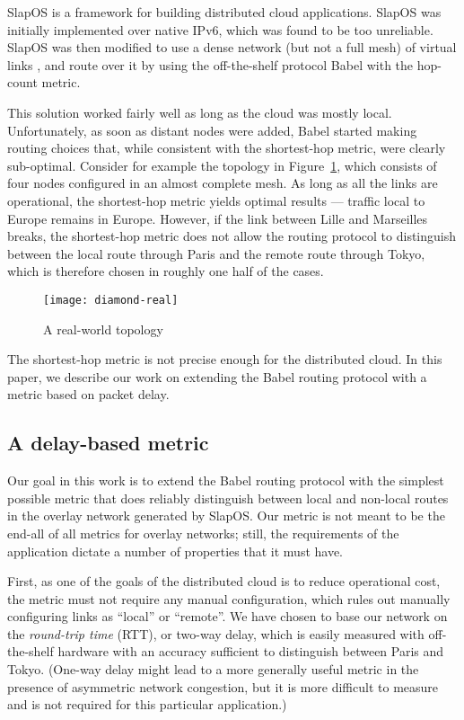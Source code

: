 \documentclass[conference,letterpaper]{IEEEtran}
\begin{document}
SlapOS is a framework for building distributed cloud applications.
SlapOS was initially implemented over native IPv6, which was found to
be too unreliable.  SlapOS was then modified to use a dense network
(but not a full mesh) of virtual links \cite{re6st}, and route over it
by using the off-the-shelf protocol Babel \cite{babel} with the
hop-count metric.

This solution worked fairly well as long as the cloud was mostly
local.  Unfortunately, as soon as distant nodes were added, Babel
started making routing choices that, while consistent with the
shortest-hop metric, were clearly sub-optimal.  Consider for example
the topology in Figure~\ref{fig:diamond-real}, which consists of four
nodes configured in an almost complete mesh.  As long as all the links
are operational, the shortest-hop metric yields optimal results ---
traffic local to Europe remains in Europe.  However, if the link
between Lille and Marseilles breaks, the shortest-hop metric does not
allow the routing protocol to distinguish between the local route
through Paris and the remote route through Tokyo, which is therefore
chosen in roughly one half of the cases.


\begin{figure}[htb]
\centering
\texttt{[image: diamond-real]}
\caption{A real-world topology}\label{fig:diamond-real}
\end{figure}

The shortest-hop metric is not precise enough for the distributed
cloud.  In this paper, we describe our work on extending the Babel
routing protocol with a metric based on packet delay.

\subsection{A delay-based metric}

Our goal in this work is to extend the Babel routing protocol with the
simplest possible metric that does reliably distinguish between local
and non-local routes in the overlay network generated by SlapOS.  Our
metric is not meant to be the end-all of all metrics for overlay
networks; still, the requirements of the application dictate a number
of properties that it must have.

First, as one of the goals of the distributed cloud is to reduce
operational cost, the metric must not require any manual
configuration, which rules out manually configuring links as ``local''
or ``remote''.  We have chosen to base our network on the
\emph{round-trip time} (RTT), or two-way delay, which is easily
measured with off-the-shelf hardware with an accuracy sufficient to
distinguish between Paris and Tokyo.  (One-way delay might lead to
a more generally useful metric in the presence of asymmetric network
congestion, but it is more difficult to measure and is not required
for this particular application.)
\end{document}
